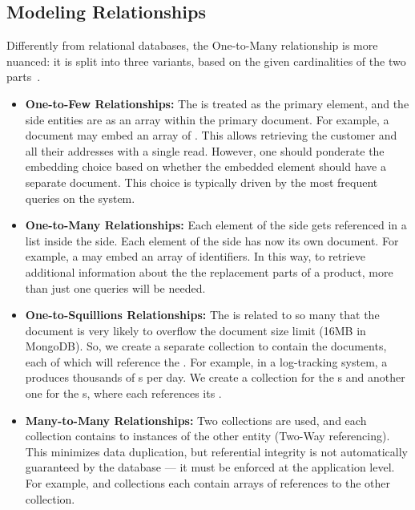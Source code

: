 \subsection{Modeling Relationships}

Differently from relational databases, the One-to-Many relationship is more nuanced: it is split into three variants, based on the given cardinalities of the two parts~\cite{mongodbschemadesign}.

\begin{itemize}
    \item \textbf{One-to-Few Relationships:} The  is treated as the primary element, and the  side entities are  as an array within the primary document. For example, a  document may embed an array of . This allows retrieving the customer and all their addresses with a single read. However, one should ponderate the embedding choice based on whether the embedded element should have a separate document. This choice is typically driven by the most frequent queries on the system.
    \item \textbf{One-to-Many Relationships:} Each element of the  side gets referenced in a list inside the  side. Each element of the  side has now its own document. 
        For example, a  may embed an array of  identifiers. In this way, to retrieve additional information about the the replacement parts of a product, more than just one queries will be needed. 
    \item \textbf{One-to-Squillions Relationships:} The  is related to so many  that the document is very likely to overflow the document size limit (16MB in MongoDB). So, we create a separate collection to contain the  documents, each of which will reference the .
        For example, in a log-tracking system, a  produces thousands of s per day. We create a collection for the s and another one for the s, where each  references its .
    \item \textbf{Many-to-Many Relationships:} Two collections are used, and each collection contains  to instances of the other entity (Two-Way referencing). This minimizes data duplication, but referential integrity is not automatically guaranteed by the database --- it must be enforced at the application level. For example,  and  collections each contain arrays of references to the other collection.
\end{itemize}

